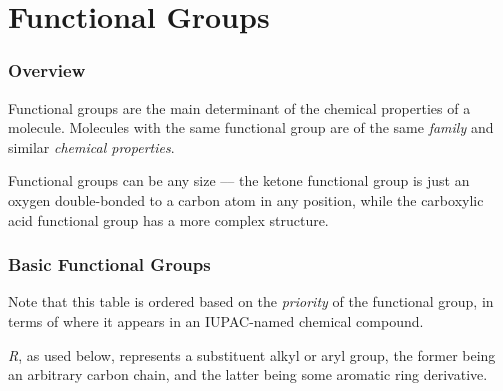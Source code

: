 

\pagebreak
\part{Functional Groups}

	\section{Overview}

		Functional groups are the main determinant of the chemical properties of a molecule. Molecules with the
		same functional group are of the same \textit{family} and similar \textit{chemical properties}.

		Functional groups can be any size –– the ketone functional group is just an oxygen double-bonded to a carbon atom
		in any position, while the carboxylic acid functional group has a more complex structure.


	\section{Basic Functional Groups}

		Note that this table is ordered based on the \textit{priority} of the functional group, in terms of where it appears in
		an IUPAC-named chemical compound.

		\textit{R}, as used below, represents a substituent alkyl or aryl group, the former being an arbitrary carbon chain, and the
		latter being some aromatic ring derivative.

